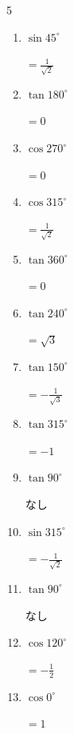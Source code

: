 \begin{multicols}{5}
\begin{enumerate}
  \item $\displaystyle \sin{45^\circ}$

        $\displaystyle =\frac{1}{\sqrt{2}}$

  \item $\displaystyle \tan{180^\circ}$

        $\displaystyle =0$

  \item $\displaystyle \cos{270^\circ}$

        $\displaystyle =0$

  \item $\displaystyle \cos{315^\circ}$

        $\displaystyle =\frac{1}{\sqrt{2}}$

  \item $\displaystyle \tan{360^\circ}$

        $\displaystyle =0$

  \item $\displaystyle \tan{240^\circ}$

        $\displaystyle =\sqrt{3}$

  \item $\displaystyle \tan{150^\circ}$

        $\displaystyle =-\frac{1}{\sqrt{3}}$

  \item $\displaystyle \tan{315^\circ}$

        $\displaystyle =-1$

\columnbreak %

  \item $\displaystyle \tan{90^\circ}$

        $\displaystyle なし$

  \item $\displaystyle \sin{315^\circ}$

        $\displaystyle =-\frac{1}{\sqrt{2}}$

  \item $\displaystyle \tan{90^\circ}$

        $\displaystyle なし$

  \item $\displaystyle \cos{120^\circ}$

        $\displaystyle =-\frac{1}{2}$

  \item $\displaystyle \cos{0^\circ}$

        $\displaystyle =1$


\end{enumerate}
\end{multicols}
